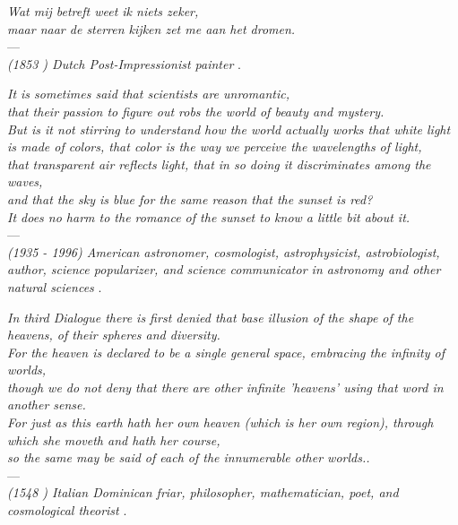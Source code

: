 
\begin{flushright}{\slshape 
    Wat mij betreft weet ik niets zeker,\\
    maar naar de sterren kijken zet me aan het dromen.\\ \medskip}
    ---\color{halfgray}{Vincent Willem van Gogh}\\ \footnotesize\textit{(1853 ) Dutch Post-Impressionist painter }.
\end{flushright}

\begin{flushright}{\slshape 
    It is sometimes said that scientists are unromantic, \\ that their passion to figure out robs the world of beauty and mystery. \\
    But is it not stirring to understand how the world actually works \texttwelveudash  that white light is made of colors,
    that color is the way we perceive the wavelengths of light,\\ that transparent air reflects light,
    that in so doing it discriminates among the waves, \\ and that the sky is blue for the same reason that the sunset is red? \\
    It does no harm to the romance of the sunset to know a little bit about it.\\ \medskip}
    ---\color{halfgray}{Carl Sagan, Pale Blue Dot: A Vision of the Human Future in Space}\\ \footnotesize\textit{(1935 - 1996) American astronomer, cosmologist, astrophysicist, astrobiologist, author, science popularizer, and science communicator in astronomy and other natural sciences }.
\end{flushright}

\begin{flushright}{\slshape 
    In  third Dialogue there is first denied that base illusion of the shape of the heavens, of their spheres and diversity.\\
    For the heaven is declared to be a single general space, embracing the infinity of worlds, \\
    though we do not deny that there are other infinite 'heavens' using that word in another sense. \\
    For just as this earth hath her own heaven (which is her own region), through which she moveth and hath her course, \\
    so the same may be said of each of the innumerable other worlds..\\ \medskip}
---\color{halfgray}{Giordano Bruno}\\ \footnotesize\textit{(1548 ) Italian Dominican friar, philosopher, mathematician, poet, and cosmological theorist }.
\end{flushright}


